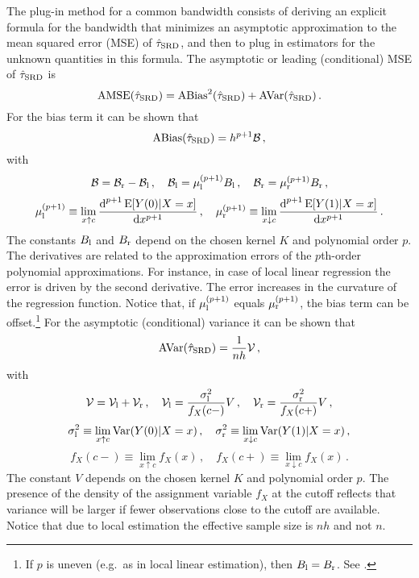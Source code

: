 The plug-in method for a common bandwidth consists of deriving an explicit formula for the bandwidth that minimizes an asymptotic approximation to the
mean squared error (MSE) of $\hat{\tau}_{\textup{SRD}}$, and then to plug in estimators for the unknown quantities in this formula.
The asymptotic or leading (conditional) MSE of $\hat{\tau}_{\textup{SRD}}$ is
\begin{equation}
	\operatorname{AMSE}(\hat{\tau}_{\textup{SRD}}) = \operatorname{ABias}^2(\hat{\tau}_{\textup{SRD}}) + \operatorname{AVar}(\hat{\tau}_{\textup{SRD}}) \,.
\end{equation}
For the bias term it can be shown \parencite[Section~4.2.2]{Cattaneo_2020_book} that
\begin{equation} \label{eq:ABias}
	\operatorname{ABias}(\hat{\tau}_{\textup{SRD}}) = h^{p+1} \mathcal{B} \,, 
\end{equation}
with
\begin{equation}
	\mathcal{B} = \mathcal{B}_{\textup{r}} - \mathcal{B}_{\textup{l}} \,,\quad \mathcal{B}_{\textup{l}} = \mu_{\textup{l}}^{(p+1)} B_{\textup{l}} \,,\quad \mathcal{B}_{\textup{r}} = \mu_{\textup{r}}^{(p+1)} B_{\textup{r}} \,,
\end{equation}
\begin{equation}
	\mu_{\textup{l}}^{(p+1)} \equiv \lim_{x \uparrow c} \frac{\mathop{}\!\textup{d}^{p+1} \operatorname{E}[Y(0) | X = x]}{\mathop{}\!\textup{d} x^{p+1}} \,,\quad  
	\mu_{\textup{r}}^{(p+1)} \equiv \lim_{x \downarrow c} \frac{\mathop{}\!\textup{d}^{p+1} \operatorname{E}[Y(1) | X = x]}{\mathop{}\!\textup{d} x^{p+1}} \,.
\end{equation}
The constants $B_{\textup{l}}$ and $B_{\textup{r}}$ depend on the chosen kernel $K$ and polynomial order $p$.
The derivatives are related to the approximation errors of the $p$th-order polynomial approximations.
For instance, in case of local linear regression the error is driven by the second derivative.
The error increases in the curvature of the regression function.
Notice that, if $\mu_{\textup{l}}^{(p+1)}$ equals $\mu_{\textup{r}}^{(p+1)}$, the bias term can be offset.\footnote{If $p$ is uneven (e.g.\ as in local linear estimation), then $B_{\textup{l}} = B_{\textup{r}}$. See \textcite[Lemma A.1]{Calonico_2014}.}
For the asymptotic (conditional) variance it can be shown that
\begin{equation} \label{eq:AVar}
	\operatorname{AVar}(\hat{\tau}_{\textup{SRD}}) = \frac{1}{nh} \mathcal{V} \,, 
\end{equation}
with
\begin{equation}
	\mathcal{V} = \mathcal{V}_{\textup{l}} + \mathcal{V}_{\textup{r}} \,,\quad \mathcal{V}_{\textup{l}} = \frac{\sigma_{\textup{l}}^2}{f_X(c-)} V \,,\quad \mathcal{V}_{\textup{r}} = \frac{\sigma_{\textup{r}}^2}{f_X(c+)} V \,,
\end{equation}
\begin{equation}
	\sigma_{\textup{l}}^2 \equiv \lim_{x \uparrow c} \operatorname{Var}(Y(0) | X = x) \,,\quad  
	\sigma_{\textup{r}}^2 \equiv \lim_{x \downarrow c} \operatorname{Var}(Y(1) | X = x) \,,
\end{equation}
\begin{equation}
	f_X(c-) \equiv \lim_{x \uparrow c} f_X(x) \,,\quad  
	f_X(c+) \equiv \lim_{x \downarrow c} f_X(x) \,.
\end{equation}
The constant $V$ depends on the chosen kernel $K$ and polynomial order $p$.
The presence of the density of the assignment variable $f_X$ at the cutoff reflects that variance will be larger if fewer observations close to the cutoff are available.
Notice that due to local estimation the effective sample size is $nh$ and not $n$.

